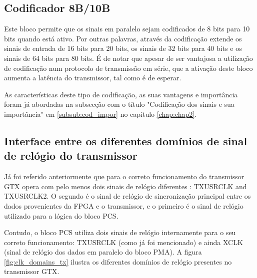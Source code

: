 \subsection{Codificador 8B/10B}

Este bloco permite que os sinais em paralelo sejam codificados de 8 bits para 10 bits quando está ativo. Por outras palavras, através da codificação extende os sinais de entrada de 16 bits para 20 bits, os sinais de 32 bits para 40 bits e os sinais de 64 bits para 80 bits. É de notar que apesar de ser vantajosa a utilização de codificação num protocolo de transmissão em série, que a ativação deste bloco aumenta a latência do transmissor, tal como é de esperar.

As características deste tipo de codificação, as suas vantagens e importância foram já abordadas na subsecção com o título "Codificação dos sinais e sua importância" em \ref{subsub:cod_impor} no capítulo \ref{chap:chap2}.

%

\subsection{Interface entre os diferentes domínios de sinal de relógio do transmissor}

Já foi referido anteriormente que para o correto funcionamento do transmissor GTX opera com pelo menos dois sinais de relógio diferentes : TXUSRCLK and TXUSRCLK2. O segundo é o sinal de relógio de sincronização principal entre os dados provenientes da FPGA e o transmissor, e o primeiro é o sinal de relógio utilizado para a lógica do bloco PCS.

Contudo, o bloco PCS utiliza dois sinais de relógio internamente para o seu correto funcionamento: TXUSRCLK (como já foi mencionado) e ainda XCLK (sinal de relógio dos dados em paralelo do bloco PMA). A figura \ref{fig:clk_domains_tx} ilustra os diferentes domínios de relógio presentes no transmissor GTX.

